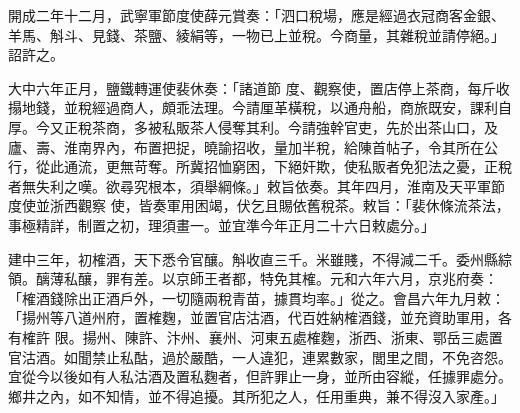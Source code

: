 \begin{pinyinscope}
 開成二年十二月，武寧軍節度使薛元賞奏：「泗口稅場，應是經過衣冠商客金銀、羊馬、斛斗、見錢、茶鹽、綾絹等，一物已上並稅。今商量，其雜稅並請停絕。」詔許之。



 大中六年正月，鹽鐵轉運使裴休奏：「諸道節
 度、觀察使，置店停上茶商，每斤收搨地錢，並稅經過商人，頗乖法理。今請厘革橫稅，以通舟船，商旅既安，課利自厚。今又正稅茶商，多被私販茶人侵奪其利。今請強幹官吏，先於出茶山口，及廬、壽、淮南界內，布置把捉，曉諭招收，量加半稅，給陳首帖子，令其所在公行，從此通流，更無苛奪。所冀招恤窮困，下絕奸欺，使私販者免犯法之憂，正稅者無失利之嘆。欲尋究根本，須舉綱條。」敕旨依奏。其年四月，淮南及天平軍節度使並浙西觀察
 使，皆奏軍用困竭，伏乞且賜依舊稅茶。敕旨：「裴休條流茶法，事極精詳，制置之初，理須畫一。並宜準今年正月二十六日敕處分。」



 建中三年，初榷酒，天下悉令官釀。斛收直三千。米雖賤，不得減二千。委州縣綜領。醨薄私釀，罪有差。以京師王者都，特免其榷。元和六年六月，京兆府奏：「榷酒錢除出正酒戶外，一切隨兩稅青苗，據貫均率。」從之。會昌六年九月敕：「揚州等八道州府，置榷麴，並置官店沽酒，代百姓納榷酒錢，並充資助軍用，各有榷許
 限。揚州、陳許、汴州、襄州、河東五處榷麴，浙西、浙東、鄂岳三處置官沽酒。如聞禁止私酤，過於嚴酷，一人違犯，連累數家，閭里之間，不免咨怨。宜從今以後如有人私沽酒及置私麴者，但許罪止一身，並所由容縱，任據罪處分。鄉井之內，如不知情，並不得追擾。其所犯之人，任用重典，兼不得沒入家產。」



\end{pinyinscope}